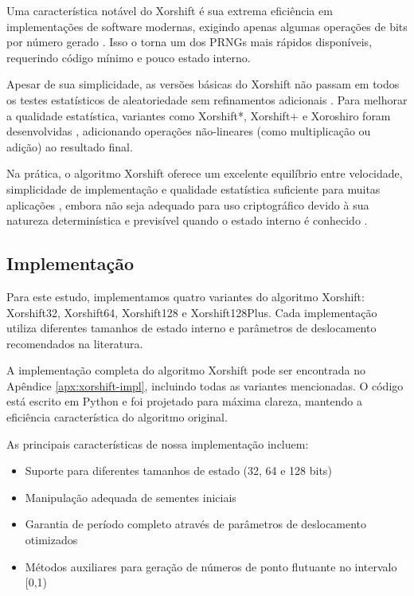 Uma característica notável do Xorshift é sua extrema eficiência em implementações de software modernas, exigindo apenas algumas operações de bits por número gerado \cite{marsaglia2003xorshift}. Isso o torna um dos PRNGs mais rápidos disponíveis, requerindo código mínimo e pouco estado interno.

Apesar de sua simplicidade, as versões básicas do Xorshift não passam em todos os testes estatísticos de aleatoriedade sem refinamentos adicionais \cite{panneton2005xorshift, vigna2016experimental}. Para melhorar a qualidade estatística, variantes como Xorshift*, Xorshift+ e Xoroshiro foram desenvolvidas \cite{vigna2016experimental, blackman2018scrambled}, adicionando operações não-lineares (como multiplicação ou adição) ao resultado final.

Na prática, o algoritmo Xorshift oferece um excelente equilíbrio entre velocidade, simplicidade de implementação e qualidade estatística suficiente para muitas aplicações \cite{vigna2016experimental, blackman2018scrambled}, embora não seja adequado para uso criptográfico devido à sua natureza determinística e previsível quando o estado interno é conhecido \cite{panneton2005xorshift}.

\subsection{Implementação}

Para este estudo, implementamos quatro variantes do algoritmo Xorshift: Xorshift32, Xorshift64, Xorshift128 e Xorshift128Plus. Cada implementação utiliza diferentes tamanhos de estado interno e parâmetros de deslocamento recomendados na literatura.

A implementação completa do algoritmo Xorshift pode ser encontrada no Apêndice \ref{apx:xorshift-impl}, incluindo todas as variantes mencionadas. O código está escrito em Python e foi projetado para máxima clareza, mantendo a eficiência característica do algoritmo original.

As principais características de nossa implementação incluem:
\begin{itemize}
    \item Suporte para diferentes tamanhos de estado (32, 64 e 128 bits)
    \item Manipulação adequada de sementes iniciais
    \item Garantia de período completo através de parâmetros de deslocamento otimizados
    \item Métodos auxiliares para geração de números de ponto flutuante no intervalo [0,1)
\end{itemize}

